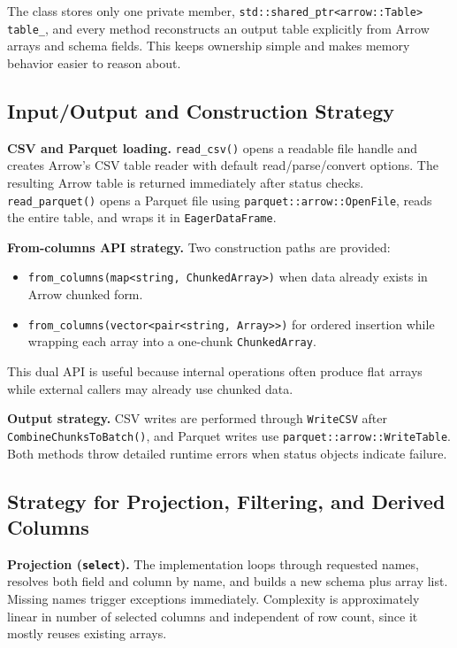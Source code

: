 \documentclass[11pt,a4paper]{article}
\begin{document}
The class stores only one private member, \texttt{std::shared\_ptr<arrow::Table> table\_}, and every method reconstructs an output table explicitly from Arrow arrays and schema fields. This keeps ownership simple and makes memory behavior easier to reason about.

\subsection{Input/Output and Construction Strategy}

\textbf{CSV and Parquet loading.} \texttt{read\_csv()} opens a readable file handle and creates Arrow's CSV table reader with default read/parse/convert options. The resulting Arrow table is returned immediately after status checks. \texttt{read\_parquet()} opens a Parquet file using \texttt{parquet::arrow::OpenFile}, reads the entire table, and wraps it in \texttt{EagerDataFrame}.

\textbf{From-columns API strategy.} Two construction paths are provided:
\begin{itemize}[leftmargin=*]
	\item \texttt{from\_columns(map<string, ChunkedArray>)} when data already exists in Arrow chunked form.
	\item \texttt{from\_columns(vector<pair<string, Array>>)} for ordered insertion while wrapping each array into a one-chunk \texttt{ChunkedArray}.
\end{itemize}
This dual API is useful because internal operations often produce flat arrays while external callers may already use chunked data.

\textbf{Output strategy.} CSV writes are performed through \texttt{WriteCSV} after \texttt{CombineChunksToBatch()}, and Parquet writes use \texttt{parquet::arrow::WriteTable}. Both methods throw detailed runtime errors when status objects indicate failure.

\subsection{Strategy for Projection, Filtering, and Derived Columns}

\textbf{Projection (\texttt{select}).} The implementation loops through requested names, resolves both field and column by name, and builds a new schema plus array list. Missing names trigger exceptions immediately. Complexity is approximately linear in number of selected columns and independent of row count, since it mostly reuses existing arrays.
\end{document}

